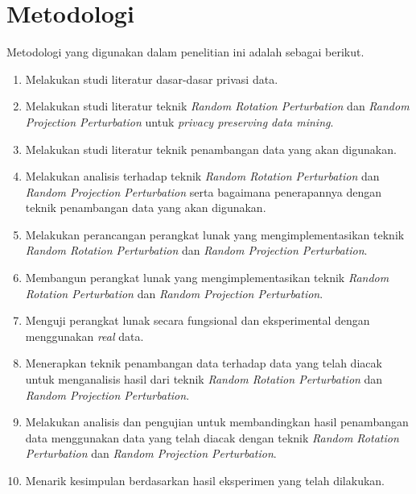 \section{Metodologi}
\label{sec:metlit}
Metodologi yang digunakan dalam penelitian ini adalah sebagai berikut.
\begin{enumerate}
    \item Melakukan studi literatur dasar-dasar privasi data.
    \item Melakukan studi literatur teknik \textit{Random Rotation Perturbation} dan \textit{Random Projection Perturbation} untuk \textit{privacy preserving data mining}.
    \item Melakukan studi literatur teknik penambangan data yang akan digunakan.
    \item Melakukan analisis terhadap teknik \textit{Random Rotation Perturbation} dan \textit{Random Projection Perturbation} serta bagaimana penerapannya dengan teknik penambangan data yang akan digunakan.
    \item Melakukan perancangan perangkat lunak yang mengimplementasikan teknik \textit{Random Rotation Perturbation} dan \textit{Random Projection Perturbation}.
    \item Membangun perangkat lunak yang mengimplementasikan teknik \textit{Random Rotation Perturbation} dan \textit{Random Projection Perturbation}.
    \item Menguji perangkat lunak secara fungsional dan eksperimental dengan menggunakan \textit{real} data.
    \item Menerapkan teknik penambangan data terhadap data yang telah diacak untuk menganalisis hasil dari teknik \textit{Random Rotation Perturbation} dan \textit{Random Projection Perturbation}.
    \item Melakukan analisis dan pengujian untuk membandingkan hasil penambangan data menggunakan data yang telah diacak dengan teknik \textit{Random Rotation Perturbation} dan \textit{Random Projection Perturbation}.
    \item Menarik kesimpulan berdasarkan hasil eksperimen yang telah dilakukan.
\end{enumerate}

